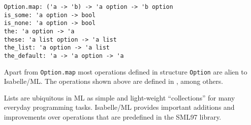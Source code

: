 \begin{isabellebody}
\begin{isamarkuptext}
\begin{description}
  \end{description}%
\end{isamarkuptext}%
\isamarkuptrue%
%
\endisatagmlref
{\isafoldmlref}%
%
\isadelimmlref
%
\endisadelimmlref
%
\isamarkuptrue%
%
\isadelimmlref
%
\endisadelimmlref
%
\isatagmlref
%
\begin{isamarkuptext}%
\begin{mldecls}
  \verb|Option.map: ('a -> 'b) -> 'a option -> 'b option| \\
  \verb|is_some: 'a option -> bool| \\
  \verb|is_none: 'a option -> bool| \\
  \verb|the: 'a option -> 'a| \\
  \verb|these: 'a list option -> 'a list| \\
  \verb|the_list: 'a option -> 'a list| \\
  \verb|the_default: 'a -> 'a option -> 'a| \\
  \end{mldecls}%
\end{isamarkuptext}%
\isamarkuptrue%
%
\endisatagmlref
{\isafoldmlref}%
%
\isadelimmlref
%
\endisadelimmlref
%
\begin{isamarkuptext}%
Apart from \verb|Option.map| most operations defined in
  structure \verb|Option| are alien to Isabelle/ML.  The
  operations shown above are defined in \hyperlink{file.~~/src/Pure/General/basics.ML}{\mbox{}}, among others.%
\end{isamarkuptext}%
\isamarkuptrue%
%
\isamarkuptrue%
%
\begin{isamarkuptext}%
Lists are ubiquitous in ML as simple and light-weight
  ``collections'' for many everyday programming tasks.  Isabelle/ML
  provides important additions and improvements over operations that
  are predefined in the SML97 library.%
\end{isamarkuptext}%
\isamarkuptrue%
%
\isadelimmlref
%
\endisadelimmlref
%
\isatagmlref
%
\begin{isamarkuptext}%
\begin{mldecls}

\end{mldecls}
\end{isamarkuptext}
\end{isabellebody}
